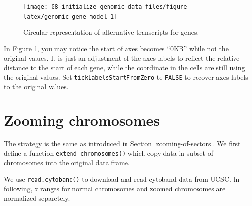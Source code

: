 \documentclass[]{book}
\newenvironment{Shaded}{\begin{snugshade}}{\end{snugshade}}
\newcommand{\KeywordTok}[1]{\textcolor[rgb]{0.13,0.29,0.53}{\textbf{#1}}}
\newcommand{\DataTypeTok}[1]{\textcolor[rgb]{0.13,0.29,0.53}{#1}}
\newcommand{\DecValTok}[1]{\textcolor[rgb]{0.00,0.00,0.81}{#1}}
\newcommand{\StringTok}[1]{\textcolor[rgb]{0.31,0.60,0.02}{#1}}
\newcommand{\OtherTok}[1]{\textcolor[rgb]{0.56,0.35,0.01}{#1}}
\newcommand{\ControlFlowTok}[1]{\textcolor[rgb]{0.13,0.29,0.53}{\textbf{#1}}}
\newcommand{\OperatorTok}[1]{\textcolor[rgb]{0.81,0.36,0.00}{\textbf{#1}}}
\newcommand{\NormalTok}[1]{#1}
\theoremstyle{definition}
\theoremstyle{definition}
\theoremstyle{remark}
\begin{document}
\begin{figure}

{\centering \texttt{[image: 08-initialize-genomic-data\_files/figure-latex/genomic-gene-model-1]} 

}

\caption{Circular representation of alternative transcripts for genes.}\label{fig:genomic-gene-model}
\end{figure}

In Figure \ref{fig:genomic-gene-model}, you may notice the start of axes
becomes ``0KB'' while not the original values. It is just an adjustment
of the axes labels to reflect the relative distance to the start of each
gene, while the coordinate in the cells are still using the original
values. Set \texttt{tickLabelsStartFromZero} to \texttt{FALSE} to
recover axes labels to the original values.

\section{Zooming chromosomes}\label{zooming-chromosomes}

The strategy is the same as introduced in Section
\ref{zooming-of-sectors}. We first define a function
\texttt{extend\_chromosomes()} which copy data in subset of chromosomes
into the original data frame.

\begin{Shaded}
\end{Shaded}

We use \texttt{read.cytoband()} to download and read cytoband data from
UCSC. In following, x ranges for normal chromosomes and zoomed
chromosomes are normalized separetely.
\end{document}
